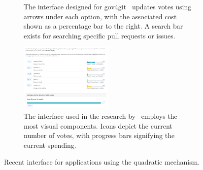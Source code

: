 {\begin{figure}[p]
\begin{subfigure}[b]{0.47\textwidth}
        \caption{The interface designed for gov4git~\cite{Gov4gitDecentralizedPlatform2023} updates votes using arrows under each option, with the associated cost shown as a percentage bar to the right. A search bar exists for searching specific pull requests or issues.}
        \label{fig:gov4gitInterface}
    \end{subfigure}
    
    \vspace{0.15cm}
    
    \begin{subfigure}[b]{0.7\textwidth}
        \centering
        \includegraphics[width=0.50\textwidth]{content/image/curr_interface/cheng_qv.png}
        \caption{The interface used in the research by~\textcite{chengCanShowWhat2021} employs the most visual components. Icons depict the current number of votes, with progress bars signifying the current spending.}
        \label{fig:chengInterface}
    \end{subfigure}
    
    \caption{Recent interface for applications using the quadratic mechanism.}
    \label{fig:qv_interface_external}
\end{figure}
\clearpage
}